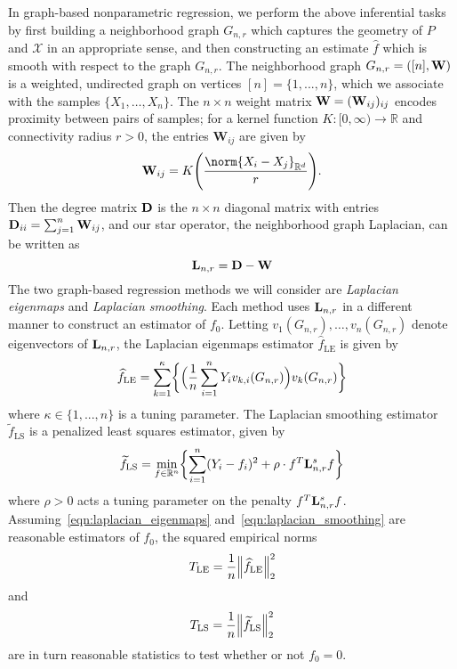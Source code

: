 \documentclass{article}
\newcommand{\Reals}{\mathbb{R}}
\newcommand{\1}{\mathbf{1}}
\newcommand{\Rd}{\Reals^d}
\newcommand{\Lap}{{\bf L}}
\newcommand{\mc}[1]{\mathcal{#1}}
\newcommand{\wt}[1]{\widetilde{#1}}
\newcommand{\wh}[1]{\widehat{#1}}
\newcommand{\LE}{\mathrm{LE}}
\newcommand{\LS}{\mathrm{LS}}
\theoremstyle{alden}
\theoremstyle{aldenthm}
\theoremstyle{definition}
\theoremstyle{remark}
\begin{document}
In graph-based nonparametric regression, we perform the above inferential tasks by first building a neighborhood graph $G_{n,r}$ which captures the geometry of $P$ and $\mc{X}$ in an appropriate sense, and then constructing an estimate $\wh{f}$ which is smooth with respect to the graph $G_{n,r}$. The neighborhood graph $G_{n,r} = ([n],{\bf W})$ is a weighted, undirected graph on vertices $[n] = \{1,...,n\}$, which we associate with the samples $\{X_1,\ldots,X_n\}$. The $n \times n$ weight matrix ${\bf W} = ({\bf W}_{ij})_{ij}$ encodes proximity between pairs of samples; for a kernel function $K: [0,\infty) \to \Reals$ and connectivity radius $r > 0$, the entries $\mathbf{W}_{ij}$ are given by
\begin{equation*}
\label{eqn:neighborhood_graph}
{\bf W}_{ij} = K\Biggl(\frac{\norm{X_i - X_j}_{\Rd}}{r}\Biggr).
\end{equation*}
Then the degree matrix ${\bf D}$ is the $n \times n$ diagonal matrix with entries ${\bf D}_{ii} = \sum_{j = 1}^{n}{\bf W}_{ij}$, and our star operator, the neighborhood graph Laplacian, can be written as
\begin{equation}
\label{eqn:graph_Laplacian}
\Lap_{n,r} = \bf{D} - \bf{W}
\end{equation}
The two graph-based regression methods we will consider are \emph{Laplacian eigenmaps} and \emph{Laplacian smoothing}. Each method uses $\Lap_{n,r}$ in a different manner to construct an estimator of $f_0$. Letting $v_1(G_{n,r}),\ldots,v_n(G_{n,r})$ denote eigenvectors of $\Lap_{n,r}$, the Laplacian eigenmaps estimator $\wh{f}_{\LE}$ \citep{belkin2003} is given by 
\begin{equation}
\label{eqn:laplacian_eigenmaps}
\wh{f}_{\textrm{LE}} = \sum_{k = 1}^{\kappa} \biggl\{\Bigl(\frac{1}{n}\sum_{i = 1}^{n} Y_i v_{k,i}(G_{n,r})\Bigr) v_{k}(G_{n,r})\biggr\}
\end{equation}
where $\kappa \in \{1,...,n\}$ is a tuning parameter. The Laplacian smoothing estimator $\wt{f}_{\LS}$ \citep{smola2003} is a penalized least squares estimator, given by
\begin{equation}
\label{eqn:laplacian_smoothing}
\wt{f}_{\LS}= \min_{f \in \Reals^n} \biggl\{\sum_{i = 1}^{n}(Y_i - f_i)^2 + \rho \cdot f^T \Lap_{n,r}^s f \biggr\}
\end{equation}
where $\rho > 0$ acts a tuning parameter on the penalty $f^T \Lap_{{n,r}}^s f$. Assuming~\eqref{eqn:laplacian_eigenmaps} and~\eqref{eqn:laplacian_smoothing} are reasonable estimators of $f_0$, the squared empirical norms
\begin{equation}
T_{\LE} = \frac{1}{n}\Bigl\|\wh{f}_{\LE}\Bigr\|_2^2 \label{eqn:laplacian_eigenmaps_test}
\end{equation}
and
\begin{equation}
T_{\LS} = \frac{1}{n}\Bigl\|\wt{f}_{\LS}\Bigr\|_2^2 \label{eqn:laplacian_smoothing_test}
\end{equation}
are in turn reasonable statistics to test whether or not $f_0 = 0$. 
\end{document}
